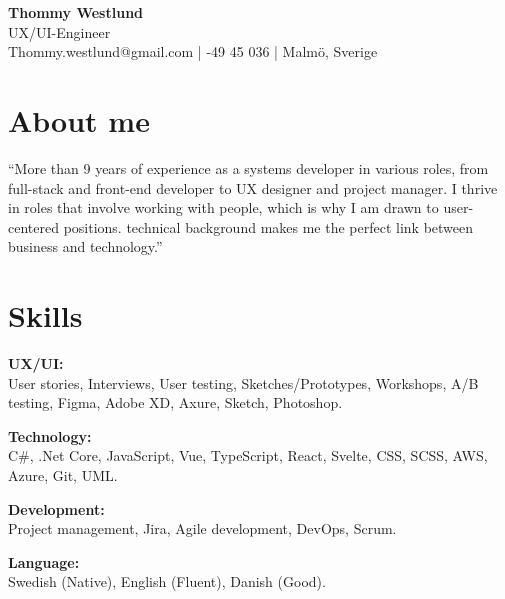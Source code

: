 \documentclass[a4paper,10pt]{article}
\begin{document}
\begin{center}
    \huge \textbf{Thommy Westlund}\\
    \vspace{0.2cm}
    \Large UX/UI-Engineer\\
    \vspace{0.3cm}
    \normalsize Thommy.westlund@gmail.com \quad | -49 45 036 \quad | \quad Malmö, Sverige
\end{center}

\vspace{0.5cm}

\section*{About me}
\vspace{0.2cm}

\noindent
“More than 9 years of experience as a systems developer in various roles, from full-stack and front-end developer to UX designer and project manager. I thrive in roles that involve working with people, which is why I am drawn to user-centered positions. technical background makes me the perfect link between business and technology.”
\vspace{0.3cm}

\section*{Skills}

\textbf{UX/UI:}\\
User stories, Interviews, User testing, Sketches/Prototypes, Workshops, A/B testing, Figma, Adobe XD, Axure, Sketch, Photoshop.

\vspace{0.3cm}

\textbf{Technology:}\\
C\#, .Net Core, JavaScript, Vue, TypeScript, React, Svelte, CSS, SCSS, AWS, Azure, Git, UML.

\vspace{0.3cm}

\textbf{Development:}\\
Project management, Jira, Agile development, DevOps, Scrum.

\vspace{0.3cm}

\textbf{Language:}\\
Swedish (Native), English (Fluent), Danish (Good).
\end{document}
